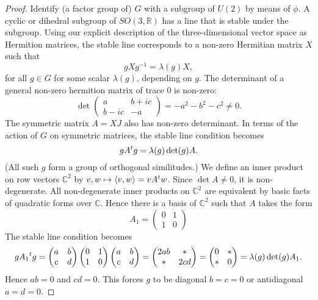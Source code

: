 \documentclass{llncs}
\newcommand{\ring}[1]{\mathbb{#1}}
\def\t#1{\hbox{}^t#1}
\begin{document}
\begin{proof} Identify (a factor group of) 
  $G$ with a subgroup of $U(2)$ by means of $\phi$.
  A cyclic or dihedral subgroup of $SO(3,\ring{R})$ has a
  line that is stable under the subgroup. Using our explicit
  description of the three-dimensional vector space as Hermition
  matrices, the stable line corresponds to a non-zero Hermitian matrix
  $X$ such that
\[
g X g^{-1} = \lambda(g) X,
\]
for all $g\in G$ for some scalar $\lambda(g)$, depending on $g$.
The determinant of a general non-zero hermition matrix of trace $0$ is non-zero:
\[
\det\begin{pmatrix} a & b + i c\\ b - i c & -a\end{pmatrix} = -a^2 - b^2 - c^2 \ne 0.
\]
The symmetric matrix $A = X J$ also has non-zero determinant.  In
terms of the action of $G$ on symmetric matrices, the stable line
condition becomes
\[
g A \t{g} = \lambda(g)\det(g) A.
\]
(All such $g$ form a group of orthogonal similitudes.)  We define an
inner product on row vectors $\ring{C}^2$ by $v,w\mapsto \langle
v,w\rangle = v A \t{w}$.  Since $\det A\ne 0$, it is non-degenerate.
All non-degenerate inner products on $\ring{C}^2$ are equivalent by
basic facts of quadratic forms over $\ring{C}$.  Hence there is a
basis of $\ring{C}^2$ such that $A$ takes the form
\[
A_1 = \begin{pmatrix} 0 & 1 \\ 1 & 0\end{pmatrix}
\]
The stable line condition becomes
\begin{equation}
g A_1 \t{g}=\begin{pmatrix} a & b \\ c & d\end{pmatrix} 
\begin{pmatrix} 0 & 1 \\ 1 & 0\end{pmatrix}
\begin{pmatrix} a & b \\ c & d\end{pmatrix} = 
\begin{pmatrix} 2 a b & * \\ * & 2 c d\end{pmatrix} =
\begin{pmatrix} 0 & * \\ * & 0\end{pmatrix} = \lambda(g)\det(g) A_1.
\end{equation}
Hence $ab=0$ and $cd=0$.  This forces $g$ to be diagonal $b=c=0$ or
antidiagonal $a=d=0$.  


\end{proof}
\end{document}
